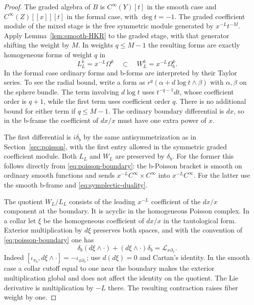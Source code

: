 \documentclass[11pt,oneside,reqno]{article}
\theoremstyle{plain}
\theoremstyle{definition}
\theoremstyle{remark}
\begin{document}
\begin{proof}
The graded algebra of \(B\) is \(C^\infty(Y)[t]\) in the smooth
case and \(C^\infty(Z)[[x]][t]\) in the formal case, with
\(\deg t=-1\). The graded coefficient module of the mixed stage
is the free symmetric module generated by \(x^{-L}t^{-M}\).
Apply Lemma~\ref{lem:smooth-HKR} to the graded stage, with that
generator shifting the weight by \(M\). In weights \(q\leq M-1\)
the resulting forms are exactly homogeneous forms of weight
\(q\) in
\[
 L_L^k=x^{-L}\Omega^k
 \quad\subset\quad W_L^k=x^{-L}\Omega_b^k.
\]
In the formal case ordinary forms and b-forms are interpreted by
their Taylor series. To see the radial bound, write a form as
\(r^q(\alpha+d\log t\wedge\beta)\) with \(\alpha,\beta\) on
the sphere bundle. The term involving \(d\log t\) uses
\(t^{-q-1}dt\), whose coefficient order is \(q+1\), while the
first term uses coefficient order \(q\). There is no additional
bound for either term if \(q\leq M-1\). The ordinary boundary
differential is \(dx\), so in the b-frame the coefficient of
\(dx/x\) must have one extra power of \(x\).

The first differential is \(i\delta_b\) by the same antisymmetrization
as in Section~\ref{sec:poisson}, with the first entry allowed in the
symmetric graded coefficient module. Both \(L_L\) and \(W_L\) are
preserved by \(\delta_b\). For the former this follows directly
from \eqref{eq:poisson-boundary}: the b-Poisson bracket is smooth
on ordinary smooth functions and sends
\(x^{-L}C^\infty\times C^\infty\) into \(x^{-L}C^\infty\).
For the latter use the smooth b-frame and
\eqref{eq:symplectic-duality}.

The quotient \(W_L/L_L\) consists of the leading \(x^{-L}\)
coefficient of the \(dx/x\) component at the boundary. It is
acyclic in the homogeneous Poisson complex. In a collar let
\(\xi\) be the homogeneous coefficient of \(dx/x\) in the
tautological form. Exterior multiplication by \(d\xi\) preserves
both spaces, and with the convention of
\eqref{eq:poisson-boundary} one has
\[
 \delta_b(d\xi\wedge\cdot)+(d\xi\wedge\cdot)\delta_b
    =\mathcal L_{x\partial_x}.
\]
Indeed \([\iota_{\pi_b},d\xi\wedge\cdot]=-\iota_{x\partial_x}\);
use \(d(d\xi)=0\) and Cartan's identity. In the smooth case a
collar cutoff equal to one near the boundary makes the exterior
multiplication global and does not affect the identity on the
quotient. The Lie derivative is multiplication by \(-L\) there.
The resulting contraction raises fiber weight by one.


\end{proof}
\end{document}
